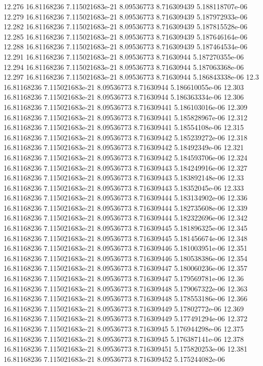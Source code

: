{12.276 16.81168236 7.115021683e-21 8.09536773 8.716309439 5.188118707e-06
12.279 16.81168236 7.115021683e-21 8.09536773 8.716309439 5.187972933e-06
12.282 16.81168236 7.115021683e-21 8.09536773 8.716309439 5.187815528e-06
12.285 16.81168236 7.115021683e-21 8.09536773 8.716309439 5.187646164e-06
12.288 16.81168236 7.115021683e-21 8.09536773 8.716309439 5.187464534e-06
12.291 16.81168236 7.115021683e-21 8.09536773 8.71630944 5.187270355e-06
12.294 16.81168236 7.115021683e-21 8.09536773 8.71630944 5.187063368e-06
12.297 16.81168236 7.115021683e-21 8.09536773 8.71630944 5.186843338e-06
12.3 16.81168236 7.115021683e-21 8.09536773 8.71630944 5.186610055e-06
12.303 16.81168236 7.115021683e-21 8.09536773 8.71630944 5.186363334e-06
12.306 16.81168236 7.115021683e-21 8.09536773 8.716309441 5.186103016e-06
12.309 16.81168236 7.115021683e-21 8.09536773 8.716309441 5.185828967e-06
12.312 16.81168236 7.115021683e-21 8.09536773 8.716309441 5.18554108e-06
12.315 16.81168236 7.115021683e-21 8.09536773 8.716309442 5.185239272e-06
12.318 16.81168236 7.115021683e-21 8.09536773 8.716309442 5.18492349e-06
12.321 16.81168236 7.115021683e-21 8.09536773 8.716309442 5.184593706e-06
12.324 16.81168236 7.115021683e-21 8.09536773 8.716309443 5.184249916e-06
12.327 16.81168236 7.115021683e-21 8.09536773 8.716309443 5.183892148e-06
12.33 16.81168236 7.115021683e-21 8.09536773 8.716309443 5.18352045e-06
12.333 16.81168236 7.115021683e-21 8.09536773 8.716309444 5.183134902e-06
12.336 16.81168236 7.115021683e-21 8.09536773 8.716309444 5.182735608e-06
12.339 16.81168236 7.115021683e-21 8.09536773 8.716309444 5.182322696e-06
12.342 16.81168236 7.115021683e-21 8.09536773 8.716309445 5.181896325e-06
12.345 16.81168236 7.115021683e-21 8.09536773 8.716309445 5.181456674e-06
12.348 16.81168236 7.115021683e-21 8.09536773 8.716309446 5.181003951e-06
12.351 16.81168236 7.115021683e-21 8.09536773 8.716309446 5.180538386e-06
12.354 16.81168236 7.115021683e-21 8.09536773 8.716309447 5.180060236e-06
12.357 16.81168236 7.115021683e-21 8.09536773 8.716309447 5.179569781e-06
12.36 16.81168236 7.115021683e-21 8.09536773 8.716309448 5.179067322e-06
12.363 16.81168236 7.115021683e-21 8.09536773 8.716309448 5.178553186e-06
12.366 16.81168236 7.115021683e-21 8.09536773 8.716309449 5.17802772e-06
12.369 16.81168236 7.115021683e-21 8.09536773 8.716309449 5.177491294e-06
12.372 16.81168236 7.115021683e-21 8.09536773 8.71630945 5.176944298e-06
12.375 16.81168236 7.115021683e-21 8.09536773 8.71630945 5.176387141e-06
12.378 16.81168236 7.115021683e-21 8.09536773 8.716309451 5.175820253e-06
12.381 16.81168236 7.115021683e-21 8.09536773 8.716309452 5.175244082e-06
}
